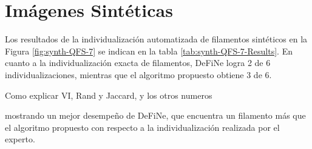 \section{Im\'agenes Sint\'eticas}

Los resultados de la individualizaci\'on automatizada de filamentos sint\'eticos en la Figura \ref{fig:synth-QFS-7} se indican en la tabla \ref{tab:synth-QFS-7-Results}. En cuanto a la individualizaci\'on exacta de filamentos, DeFiNe logra 2 de 6 individualizaciones, mientras que el algoritmo propuesto obtiene 3 de 6.


Como explicar VI, Rand y Jaccard, y los otros numeros

mostrando un mejor desempe\~no de DeFiNe, que encuentra un filamento m\'as que el algoritmo propuesto con respecto a la individualizaci\'on realizada por el experto.

